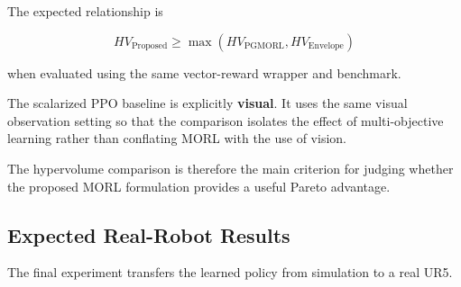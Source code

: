\documentclass[journal]{IEEEtran}
\begin{document}
The expected relationship is

\begin{equation}
\boxed{
HV_{\mathrm{Proposed}}
\geq
\max
\left(
HV_{\mathrm{PGMORL}},
HV_{\mathrm{Envelope}}
\right)
}
\end{equation}

when evaluated using the same vector-reward wrapper and benchmark.

The scalarized PPO baseline is explicitly \textbf{visual}. It uses the
same visual observation setting so that the comparison isolates the
effect of multi-objective learning rather than conflating MORL with
the use of vision.

The hypervolume comparison is therefore the main criterion for judging
whether the proposed MORL formulation provides a useful Pareto
advantage.


\subsection{Expected Real-Robot Results}

The final experiment transfers the learned policy from simulation to a
real UR5.
\end{document}
